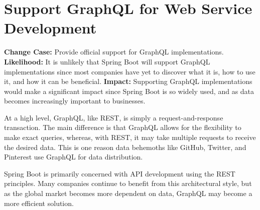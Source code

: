 \section*{Support GraphQL for Web Service Development}

\begin{textbox}
	\obeylines
	\textbf{Change Case:} Provide official support for GraphQL implementations.
	\textbf{Likelihood:} It is unlikely that Spring Boot will support GraphQL implementations since most companies have yet to discover what it is, how to use it, and how it can be beneficial.
	\textbf{Impact:} Supporting GraphQL implementations would make a significant impact since Spring Boot is so widely used, and as data becomes increasingly important to businesses.
\end{textbox}

\medskip

At a high level, GraphQL, like REST, is simply a request-and-response transaction. The main difference is that GraphQL allows for the flexibility to make exact queries, whereas, with REST, it may take multiple requests to receive the desired data. This is one reason data behemoths like GitHub, Twitter, and Pinterest use GraphQL for data distribution.

Spring Boot is primarily concerned with API development using the REST principles. Many companies continue to benefit from this architectural style, but as the global market becomes more dependent on data, GraphQL may become a more efficient solution.